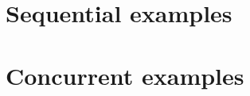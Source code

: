 \documentclass[10pt]{article}
\begin{document}
\section{Sequential examples}

\ResultsSequentialInfo

\vspace{3em}

\ResultsSequentialTimes

\pagebreak

\section{Concurrent examples}

\ResultsConcurrentInfo

\vspace{3em}

\ResultsConcurrentTimes
\end{document}
